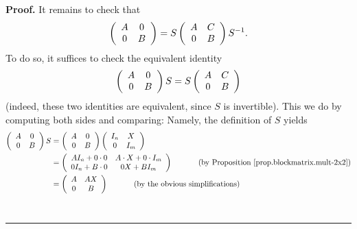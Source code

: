 \documentclass[numbers=enddot,12pt,final,onecolumn,notitlepage]{scrartcl}%
\numberwithin{exer}{subsection}
\theoremstyle{definition}
\newenvironment{proof}[1][Proof]{\noindent\textbf{#1.} }{\ \rule{0.5em}{0.5em}}
\begin{document}
\begin{proof}
It remains to check that%
\begin{equation}
\left(
\begin{array}
[c]{cc}%
A & 0\\
0 & B
\end{array}
\right)  =S\left(
\begin{array}
[c]{cc}%
A & C\\
0 & B
\end{array}
\right)  S^{-1}. \label{pf.cor.schurtri.block-sim.4}%
\end{equation}
To do so, it suffices to check the equivalent identity%
\begin{equation}
\left(
\begin{array}
[c]{cc}%
A & 0\\
0 & B
\end{array}
\right)  S=S\left(
\begin{array}
[c]{cc}%
A & C\\
0 & B
\end{array}
\right)  \label{pf.cor.schurtri.block-sim.5}%
\end{equation}
(indeed, these two identities are equivalent, since $S$ is invertible). This
we do by computing both sides and comparing: Namely, the definition of $S$
yields%
\begin{align*}
\left(
\begin{array}
[c]{cc}%
A & 0\\
0 & B
\end{array}
\right)  S  &  =\left(
\begin{array}
[c]{cc}%
A & 0\\
0 & B
\end{array}
\right)  \left(
\begin{array}
[c]{cc}%
I_{n} & X\\
0 & I_{m}%
\end{array}
\right) \\
&  =\left(
\begin{array}
[c]{cc}%
AI_{n}+0\cdot0 & A\cdot X+0\cdot I_{m}\\
0I_{n}+B\cdot0 & 0X+BI_{m}%
\end{array}
\right)  \ \ \ \ \ \ \ \ \ \ \left(  \text{by Proposition
\ref{prop.blockmatrix.mult-2x2}}\right) \\
&  =\left(
\begin{array}
[c]{cc}%
A & AX\\
0 & B
\end{array}
\right)  \ \ \ \ \ \ \ \ \ \ \left(  \text{by the obvious simplifications}%
\right)

\end{align*}
\end{proof}
\end{document}
